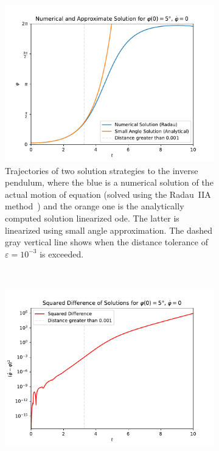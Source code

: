 		\begin{figure}
			\centering
			\begin{subfigure}[t]{0.5\linewidth}
				\centering
				\includegraphics[width = \linewidth]{figures/introduction/generated/pendulum-motion-solutions}
				\caption[Trajectories of the small angle approximate solution of the inverse pendulum and a numerical solution]{Trajectories of two solution strategies to the inverse pendulum, where the blue is a numerical solution of the actual motion of equation (solved using the Radau~IIA method~\cite[p.~72]{guglielmiImplementingRadauIIA2001}) and the orange one is the analytically computed solution linearized \ac{ode}. The latter is linearized using small angle approximation. The dashed gray vertical line shows when the distance tolerance of \( \varepsilon = 10^{-3} \) is exceeded.}
			\end{subfigure}%
			~
			\begin{subfigure}[t]{0.5\linewidth}
				\centering
				\includegraphics[width = \linewidth]{figures/introduction/generated/pendulum-motion-difference}

\end{subfigure}
\end{figure}
